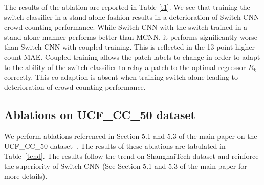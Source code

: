 \documentclass[10pt,twocolumn,letterpaper]{article}
\begin{document}
The results of the ablation are reported in Table \ref{t1}. We see that training the switch classifier in a stand-alone fashion results in a deterioration of Switch-CNN crowd counting performance. While Switch-CNN with the switch trained in a stand-alone manner performs better than MCNN, it performs significantly worse than Switch-CNN with coupled training. This is reflected in the 13 point higher count MAE. Coupled training allows the patch labels to change in order to adapt to the ability of the switch classifier to relay a patch to the optimal regressor $R_k$ correctly. This co-adaption is absent when training switch alone leading to deterioration of crowd counting performance.
\begin{table}[!h]
\begin{centering}

\par\end{centering}
\vspace*{1.2mm}
\caption{Comparison of MAE for Switch-CNN trained with and without \emph{Coupled Training} on Part A of the ShanghaiTech dataset~\cite{zhang2016single}.}
\label{t1}
\end{table}


\subsection{Ablations on UCF\_CC\_50 dataset}
 We perform ablations referenced in Section 5.1 and 5.3 of the main paper on the UCF\_CC\_50 dataset~\cite{idrees2013multi}. The results of these ablations are tabulated in Table~\ref{tend}. The results follow the trend on ShanghaiTech dataset and reinforce the superiority of Switch-CNN (See Section 5.1 and 5.3 of the main paper for more details).



\begin{table}[!h]
\centering

\vspace{.1cm}
\medskip{}
\caption{Additional results for ablations referenced in Section 5.1 and 5.3 of the main paper for UCF\_CC\_50 dataset\cite{idrees2013multi}.}
\label{tend}
\end{table}
\end{document}
